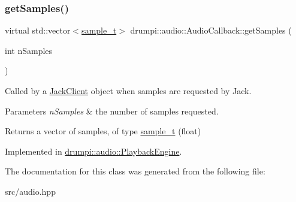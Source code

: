 \subsubsection{\texorpdfstring{get\+Samples()}{getSamples()}}
{\footnotesize\ttfamily virtual std\+::vector$<$\hyperlink{namespacedrumpi_1_1audio_aca0bdc9164f87b72057e284442abab6e}{sample\+\_\+t}$>$ drumpi\+::audio\+::\+Audio\+Callback\+::get\+Samples (\begin{DoxyParamCaption}\item[{int}]{n\+Samples }\end{DoxyParamCaption})\hspace{0.3cm}{\ttfamily [pure virtual]}}

Called by a \hyperlink{classdrumpi_1_1audio_1_1JackClient}{Jack\+Client} object when samples are requested by Jack. 
\begin{DoxyParams}{Parameters}
{\em n\+Samples} & the number of samples requested. \\
\hline
\end{DoxyParams}
\begin{DoxyReturn}{Returns}
a vector of samples, of type \hyperlink{namespacedrumpi_1_1audio_aca0bdc9164f87b72057e284442abab6e}{sample\+\_\+t} ({\ttfamily float}) 
\end{DoxyReturn}


Implemented in \hyperlink{classdrumpi_1_1audio_1_1PlaybackEngine_a16f4d8c36323b3b580475cd5fc4421c2}{drumpi\+::audio\+::\+Playback\+Engine}.



The documentation for this class was generated from the following file\+:\begin{DoxyCompactItemize}
\item 
src/audio.\+hpp\end{DoxyCompactItemize}
